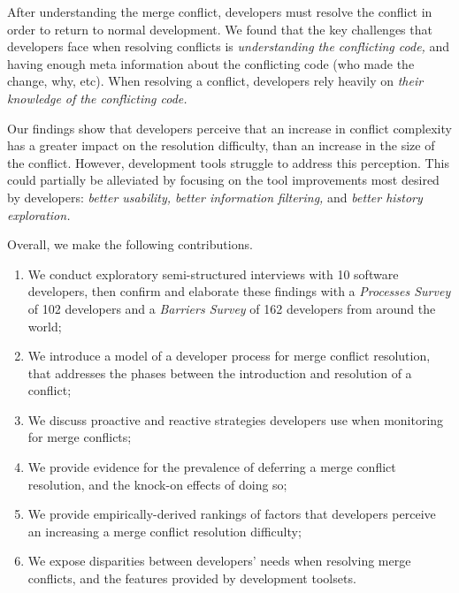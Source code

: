 After understanding the merge conflict, developers must resolve the conflict in order to return to normal development.
We found that the key challenges that developers face when resolving conflicts is \textit{understanding the conflicting code,} and having enough meta information about the conflicting code (who made the change, why, etc).
When resolving a conflict, developers rely heavily on \textit{their knowledge of the conflicting code.} 

Our findings show that developers perceive that an increase in conflict complexity has a greater impact on the resolution difficulty, than an increase in the size of the conflict.
However, development tools struggle to address this perception.
This could partially be alleviated by focusing on the tool improvements most desired by developers: \textit{better usability, better information filtering,} and \textit{better history exploration.}


Overall, we make the following contributions.
\begin{enumerate}
\item We conduct exploratory semi-structured interviews with 10 software developers, then confirm and elaborate these findings with a \textit{Processes Survey} of 102 developers and a \textit{Barriers Survey} of 162 developers from around the world;
\item We introduce a model of a developer process for merge conflict resolution, that addresses the phases between the introduction and resolution of a conflict;
\item We discuss proactive and reactive strategies developers use when monitoring for merge conflicts;
\item We provide evidence for the prevalence of deferring a merge conflict resolution, and the knock-on effects of doing so;
\item We provide empirically-derived rankings of factors that developers perceive an increasing a merge conflict resolution difficulty;
\item We expose disparities between developers' needs when resolving merge conflicts, and the features provided by development toolsets.
\end{enumerate}